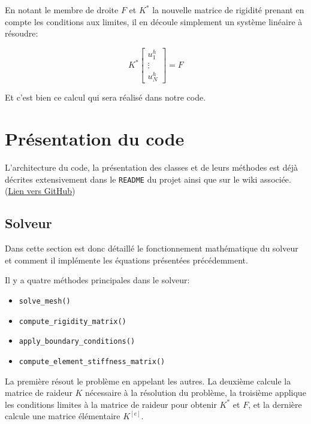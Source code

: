 \documentclass{article}
\begin{document}
En notant le membre de droite $F$ et $K^*$ la nouvelle
matrice de rigidité prenant en compte les conditions aux limites,
il en découle simplement un système linéaire à résoudre:

\begin{equation}
    K^*
    \begin{bmatrix}
        u^h_1 \\ \vdots \\ u^h_N
    \end{bmatrix}
    = F
\end{equation}

Et c'est bien ce calcul qui sera réalisé dans notre code.

\newpage

\section{Présentation du code}

L'architecture du code, la présentation des classes et de leurs
méthodes est déjà décrites extensivement dans le \verb|README|
du projet ainsi que sur le wiki associée.
(\href{https://github.com/LuciferC-137/FiniteElementElec}{Lien vers GitHub})

\subsection{Solveur}

Dans cette section est donc détaillé le fonctionnement
mathématique du solveur et comment il implémente les équations
présentées précédemment.

Il y a quatre méthodes principales dans le solveur:

\begin{itemize}
    \item \verb|solve_mesh()|
    \item \verb|compute_rigidity_matrix()|
    \item \verb|apply_boundary_conditions()|
    \item \verb|compute_element_stiffness_matrix()|
\end{itemize}

La première résout le problème en appelant les autres.
La deuxième calcule la matrice de raideur $K$ nécessaire à la
résolution du problème, la troisième applique les conditions
limites à la matrice de raideur pour obtenir $K^*$ et $F$, et la dernière calcule
une matrice élémentaire $K^{[e]}$.
\end{document}
